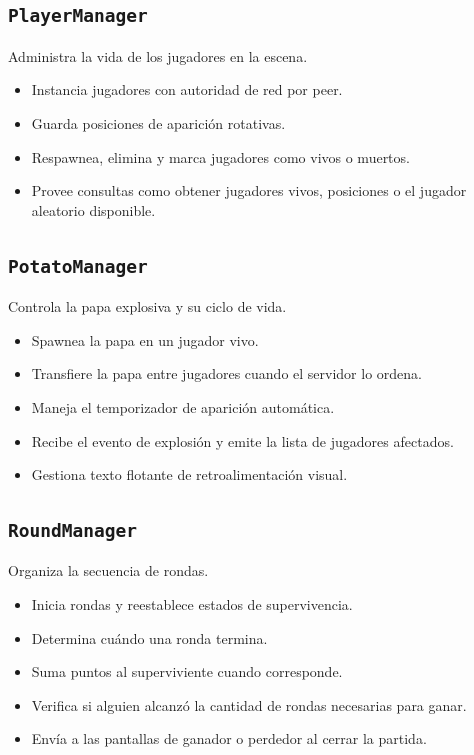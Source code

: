\documentclass[11pt,a4paper]{article}
\begin{document}
\subsection{\texttt{PlayerManager}}
Administra la vida de los jugadores en la escena.
\begin{itemize}[nosep]
    \item Instancia jugadores con autoridad de red por peer.
    \item Guarda posiciones de aparición rotativas.
    \item Respawnea, elimina y marca jugadores como vivos o muertos.
    \item Provee consultas como obtener jugadores vivos, posiciones o el jugador aleatorio disponible.
\end{itemize}

\subsection{\texttt{PotatoManager}}
Controla la papa explosiva y su ciclo de vida.
\begin{itemize}[nosep]
    \item Spawnea la papa en un jugador vivo.
    \item Transfiere la papa entre jugadores cuando el servidor lo ordena.
    \item Maneja el temporizador de aparición automática.
    \item Recibe el evento de explosión y emite la lista de jugadores afectados.
    \item Gestiona texto flotante de retroalimentación visual.
\end{itemize}

\subsection{\texttt{RoundManager}}
Organiza la secuencia de rondas.
\begin{itemize}[nosep]
    \item Inicia rondas y reestablece estados de supervivencia.
    \item Determina cuándo una ronda termina.
    \item Suma puntos al superviviente cuando corresponde.
    \item Verifica si alguien alcanzó la cantidad de rondas necesarias para ganar.
    \item Envía a las pantallas de ganador o perdedor al cerrar la partida.
\end{itemize}
\end{document}
